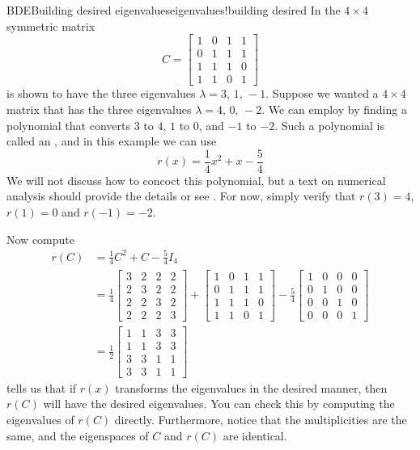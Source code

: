 \begin{example}{BDE}{Building desired eigenvalues}{eigenvalues!building desired}
In  the $4\times 4$ symmetric matrix
%
\begin{equation*}
C=
\begin{bmatrix}
1 &  0 &  1 &  1\\ 
0 &  1 &  1 &  1\\ 
1 &  1 &  1 &  0\\ 
1 &  1 &  0 &  1
\end{bmatrix}
\end{equation*}
%
is shown to have the three eigenvalues $\lambda=3,\,1,\,-1$.  Suppose we wanted a $4\times 4$ matrix that has the three eigenvalues $\lambda=4,\,0,\,-2$.  We can employ  by finding a polynomial that converts $3$ to $4$, $1$ to $0$, and $-1$ to $-2$.  Such a polynomial is called an , and in this example we can use
%
\begin{equation*}
r(x)=\frac{1}{4}x^2+x-\frac{5}{4}
\end{equation*}
%
We will not discuss how to concoct this polynomial, but a text on numerical analysis should provide the details or see .  For now, simply verify that $r(3)=4$, $r(1)=0$ and $r(-1)=-2$.\par
%
Now compute
%
\begin{align*}
r(C)&=\frac{1}{4}C^2+C-\frac{5}{4}I_4\\
&=
\frac{1}{4}
\begin{bmatrix}
3 &  2 &  2 &  2\\
2 &  3 &  2 &  2\\
2 &  2 &  3 &  2\\
2 &  2 &  2 &  3
\end{bmatrix}
+
\begin{bmatrix}
1 &  0 &  1 &  1\\ 
0 &  1 &  1 &  1\\ 
1 &  1 &  1 &  0\\ 
1 &  1 &  0 &  1
\end{bmatrix}
-\frac{5}{4}
\begin{bmatrix}
1 &  0 &  0 &  0\\ 
0 &  1 &  0 &  0\\ 
0 &  0 &  1 &  0\\ 
0 &  0 &  0 &  1
\end{bmatrix}\\
%
&=
\frac{1}{2}
\begin{bmatrix}
1 &  1 &  3 &  3\\
1 &  1 &  3 &  3\\
3 &  3 &  1 &  1\\
3 &  3 &  1 &  1
\end{bmatrix}
%
\end{align*}
%
 tells us that if $r(x)$ transforms the eigenvalues in the desired manner, then $r(C)$ will have the desired eigenvalues.  You can check this by computing the eigenvalues of $r(C)$ directly.  Furthermore, notice that the multiplicities are the same, and the eigenspaces of $C$ and $r(C)$ are identical.
\end{example}
